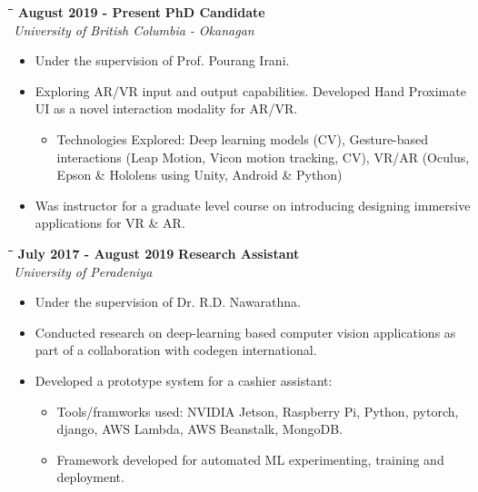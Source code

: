 \documentclass[a4paper,9.5pt]{article}
\newcommand{\timeline}[3]{%
  \begin{tabbing}
    \=\hspace*{1cm}\=\hspace*{6cm}\=\hspace*{5cm}\= \kill
    \>\>\textbf{#1} \> \textbf{#2}\\\>\>\> \emph{#3}
  \end{tabbing}
}
\begin{document}
\vspace{-0.1cm}
\begin{center}
  \begin{minipage}[h]{0.95\linewidth}
    \timeline{August 2019 - Present}{PhD Candidate}{University of British Columbia - Okanagan}
    \centering
    \vspace{-0.3cm}
    \begin{itemize}
      \setlength\itemsep{-0.1cm}
    \item Under the supervision of Prof. Pourang Irani.
    \item Exploring AR/VR input and output capabilities. Developed Hand Proximate UI as a novel interaction modality for AR/VR.
      \vspace{-5pt}
      \begin{itemize}
      \item Technologies Explored: Deep learning models (CV), Gesture-based interactions (Leap Motion, Vicon motion tracking, CV), VR/AR (Oculus, Epson \& Hololens using Unity, Android \& Python)
      \end{itemize}
      \vspace{-0.2cm}
    \item Was instructor for a graduate level course on introducing designing immersive applications for VR \& AR.
    \end{itemize}
  \end{minipage}
\end{center}
\vspace{-0.1cm}
\begin{center}
  \begin{minipage}[h]{0.95\linewidth}
    \timeline{July 2017 - August 2019}{Research Assistant}{University of Peradeniya}
    \centering
    \vspace{-0.3cm}
    \begin{itemize}
      \setlength\itemsep{-0.1cm}
    \item Under the supervision of Dr. R.D. Nawarathna.
    \item Conducted research on deep-learning based computer vision applications as part of a collaboration with codegen international.
    \item Developed a prototype system for a cashier assistant:
      \vspace{-5pt}
      \begin{itemize}
        \setlength\itemsep{-0.1cm}
      \item Tools/framworks used: NVIDIA Jetson, Raspberry Pi, Python, pytorch, django, AWS Lambda, AWS Beanstalk, MongoDB.
      \item Framework developed for automated ML experimenting, training and deployment.
      \end{itemize}
    \end{itemize}
  \end{minipage}
\end{center}
\end{document}
